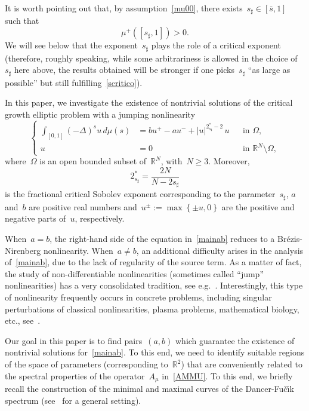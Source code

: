 \documentclass[12pt,a4paper,intlimits,sumlimits]{amsart}
\def \R {\mathbb{R}}
\newcommand{\Fucik}{Fu\v c\'\i k }
\newcommand{\set}[1]{\left\{#1\right\}}
\theoremstyle{definition}
\theoremstyle{plain}
\numberwithin{equation}{section}
\renewcommand{\ge}{\geqslant}
\begin{document}
It is worth pointing out that, by assumption~\eqref{mu00}, 
there exists~$s_\sharp\in [\overline s, 1]$ such that
\begin{equation}\label{scritico}
\mu^+ ([s_\sharp, 1])> 0.
\end{equation}
We will see below that the exponent~$s_\sharp$ plays the role of a critical exponent
(therefore, roughly speaking, while some arbitrariness is allowed in the choice of~$s_\sharp$ here above,
the results obtained will be stronger if one picks~$s_\sharp$ ``as large as possible''
but still fulfilling~\eqref{scritico}).
\medskip

In this paper,
we investigate the existence of nontrivial solutions of the critical growth elliptic problem with a jumping nonlinearity
\begin{equation} \label{mainab}
\left\{\begin{aligned}
\int_{[{{ 0 }}, 1]} (-\Delta)^s u\, d\mu(s) & = bu^+ - au^- + |u|^{2_{s_\sharp}^\ast - 2}\, u && \text{in } \Omega,\\
u & = 0 && \text{in } \R^N \setminus \Omega,
\end{aligned}\right.
\end{equation}
where~$\Omega$ is an open bounded subset of~$\R^N$, with~$N\ge 3$.
Moreover, $$2_{s_\sharp}^\ast = \frac{2N}{N - 2s_\sharp}$$ is the fractional critical Sobolev exponent
corresponding to the parameter~$s_\sharp$, $a$ and~$ b $ are positive real numbers
and~$u^\pm := \max \set{\pm u,0}$ are the positive and negative parts of~$u$, respectively.

When~$a = b $, the right-hand side of the equation in~\eqref{mainab} reduces to a Br{\'e}zis-Nirenberg 
nonlinearity.
When~$a\ne b$, an additional difficulty arises in the analysis of~\eqref{mainab},
due to the lack of regularity of the source term.
As a matter of fact, the study of non-differentiable nonlinearities (sometimes called
``jump'' nonlinearities) has a very consolidated tradition,
see e.g.~\cite{MR499709, MR1181350, MR1215262, MR1725568}.
Interestingly, this type of nonlinearity frequently occurs in concrete problems, including singular perturbations of classical nonlinearities, plasma problems,
mathematical biology, etc., see~\cite{MR1303035}.
\medskip

Our goal in this paper is to find pairs~$(a,b)$ which guarantee the existence of nontrivial solutions for~\eqref{mainab}.
To this end, we need to identify suitable regions of the space of parameters (corresponding to~$\R^2$)
that are conveniently related to the spectral properties of the operator~$A_\mu$ in~\eqref{AMMU}.
To this end, we briefly recall the construction of the minimal and maximal curves of the Dancer-\Fucik spectrum (see~\cite[Chapter 4]{MR3012848} for a general setting). 
\end{document}
